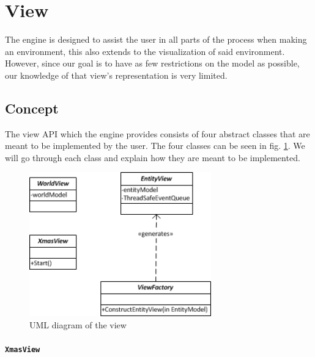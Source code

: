 
\section{View}

The engine is designed to assist the user in all parts of the process
when making an environment, this also extends to the visualization
of said environment. However, since our goal is to have as few restrictions
on the model as possible, our knowledge of that view\textquoteright{}s
representation is very limited.


\subsection{Concept}

The view API which the engine provides consists of four abstract classes
that are meant to be implemented by the user. The four classes can
be seen in fig. \ref{fig:ViewUMLView}. We will go through each class
and explain how they are meant to be implemented.

\begin{figure}
\begin{centering}
\includegraphics[width=0.7\textwidth]{ViewUmlDomainDiagram}
\par\end{centering}

\caption{UML diagram of the view\label{fig:ViewUMLView}}
\end{figure}



\paragraph*{\texttt{XmasView}}

